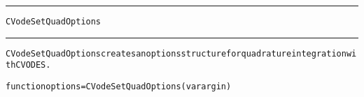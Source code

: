 \begin{samepage}
\hrule
\begin{center}
{\large \verb!CVodeSetQuadOptions!}
\label{p:CVodeSetQuadOptions}
\end{center}
\hrule\vspace{0.1in}



\begin{alltt}
CVodeSetQuadOptions creates an options structure for quadrature integration with CVODES.
\end{alltt}

\end{samepage}



\begin{samepage}


\begin{alltt}
function options = CVodeSetQuadOptions(varargin) 
\end{alltt}

\end{samepage}



